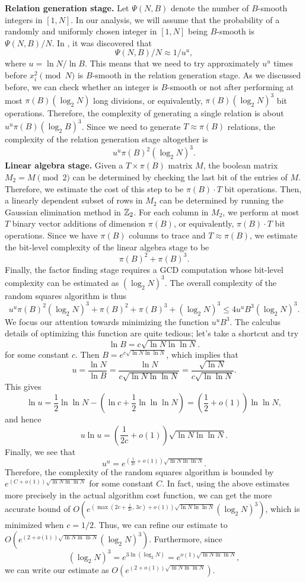 {\bf Relation generation stage.} Let $\Psi(N, B)$ denote the number of 
$B$-smooth integers in $[1, N]$. In our analysis, we will assume that the 
probability of a randomly and uniformly chosen integer in $[1, N]$ being 
$B$-smooth is $\Psi(N, B)/N$. In \cite{CANFIELD19831}, it was discovered that 
\[ \Psi(N,B)/N \approx 1/u^u, \] 
where $u = \ln N/\ln B$. This means that we need to try approximately $u^u$ 
times before $x_i^2 \pmod N$ is $B$-smooth in the relation generation stage. 
As we discussed before, we can check whether an integer is $B$-smooth or 
not after performing at most $\pi(B) (\log_2 N)$ long divisions, or equivalently, 
$\pi(B) (\log_2 N)^3$ bit operations. Therefore, the complexity of generating 
a single relation is about $u^u \pi(B) (\log_2 B)^3$. Since we need to generate 
$T \approx \pi(B)$ relations, the complexity of the relation generation stage 
altogether is 
\[ u^u \pi(B)^2 (\log_2 N)^3. \] 
{\bf Linear algebra stage.} Given a $T \times \pi(B)$ matrix $M$, the boolean 
matrix $M_2 = M \pmod 2$ can be determined by checking the last bit of the 
entries of $M$. Therefore, we estimate the cost of this step to be $\pi(B) 
\cdot T$ bit operations. Then, a linearly dependent subset of rows in $M_2$ 
can be determined by running the Gaussian elimination method in $\mathbb{Z}_2$. 
For each column in $M_2$, we perform at most $T$ binary vector additions 
of dimension $\pi(B)$, or equivalently, $\pi(B) \cdot T$ bit operations. 
Since we have $\pi(B)$ columns to trace and $T \approx \pi(B)$, we estimate 
the bit-level complexity of the linear algebra stage to be 
\[ \pi(B)^2 + \pi(B)^3. \] 
Finally, the factor finding stage requires a GCD computation whose bit-level 
complexity can be estimated as $(\log_2 N)^3$. The overall complexity of the 
random squares algorithm is thus 
\[ u^u \pi(B)^2 (\log_2 N)^3 + \pi(B)^2 + \pi(B)^3 + (\log_2 N)^3 
\leq 4u^u B^3 (\log_2 N)^3. \] 
We focus our attention towards minimizing the function $u^u B^3$. The calculus 
details of optimizing this function are quite tedious; let's take a shortcut 
and try 
\[ \ln B = c\sqrt{\ln N \ln\ln N}. \] 
for some constant $c$. Then $B = e^{c\sqrt{\ln N \ln\ln N}}$, which implies that 
\[ u = \frac{\ln N}{\ln B} = \frac{\ln N}{c\sqrt{\ln N \ln\ln N}} = 
\frac{\sqrt{\ln N}}{c\sqrt{\ln \ln N}}. \] 
This gives 
\[ \ln u = \frac12 \ln\ln N - \left( \ln c + \frac12 \ln\ln\ln N \right) 
= \left( \frac12 + o(1) \right) \ln\ln N, \] 
and hence 
\[ u\ln u = \left( \frac1{2c} + o(1) \right) \sqrt{\ln N \ln\ln N}. \] 
Finally, we see that 
\[ u^u = e^{(\frac1{2c} + o(1)) \sqrt{\ln N \ln\ln N}}. \] 
Therefore, the complexity of the random squares algorithm is bounded by 
$e^{(C + o(1)) \sqrt{\ln N \ln\ln N}}$
for some constant $C$. In fact, using the above estimates more precisely in the 
actual algorithm cost function, we can get the more accurate bound of 
$O(e^{(\max(2c + \frac{1}{2c},\,3c) + o(1)) \sqrt{\ln N \ln\ln N}} (\log_2 N)^3)$,
which is minimized when $c = 1/2$. Thus, we can refine our estimate to 
$O( e^{(2 + o(1)) \sqrt{ \ln N \ln\ln N}} (\log_2 N)^3)$. 
Furthermore, since 
\[ (\log_2 N)^3 = e^{3\ln(\log_2 N)} = e^{o(1) \sqrt{\ln N \ln\ln N}}, \] 
we can write our estimate as $O(e^{(2+o(1))\sqrt{\ln N \ln\ln N}})$. 

